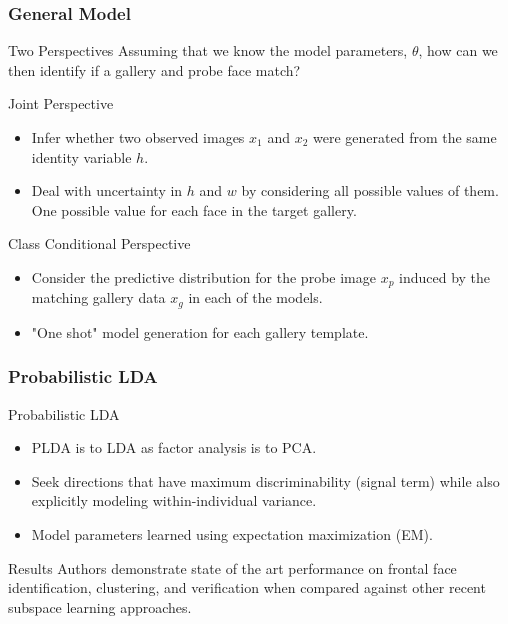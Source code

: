 \documentclass{beamer}
\begin{document}
\begin{frame}
\frametitle{General Model}
\begin{block}{Two Perspectives}
Assuming that we know the model parameters, $\theta$, how can we then identify if a gallery and probe face match?
\end{block}
\pause
\begin{block}{Joint Perspective}
\begin{itemize}
\item Infer whether two observed images $x_1$ and $x_2$ were generated from the same identity variable $h$.
\pause
\item Deal with uncertainty in $h$ and $w$ by considering all possible values of them. One possible value for each face in the target gallery.
\end{itemize}
\end{block}
\pause
\begin{block}{Class Conditional Perspective}
\begin{itemize}
\item Consider the predictive distribution for the probe image $x_p$ induced by the matching gallery data $x_g$ in each of the models.
\pause
\item "One shot" model generation for each gallery template.
\end{itemize}
\end{block}
\end{frame}

\begin{frame}
\frametitle{Probabilistic LDA}
\begin{block}{Probabilistic LDA}
\begin{itemize}
\item PLDA is to LDA as factor analysis is to PCA.
\pause
\item Seek directions that have maximum discriminability (signal term) while also explicitly modeling within-individual variance.
\pause
\item Model parameters learned using expectation maximization (EM).
\end{itemize}
\end{block}
\pause
\begin{block}{Results}
Authors demonstrate state of the art performance on frontal face identification, clustering, and verification when compared against other recent subspace learning approaches.
\end{block}
\end{frame}
\end{document}
